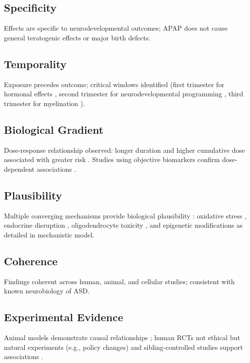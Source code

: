 \documentclass[12pt]{article}
\begin{document}
\subsection{Specificity}
Effects are specific to neurodevelopmental outcomes; APAP does not cause general teratogenic effects or major birth defects.

\subsection{Temporality}
Exposure precedes outcome; critical windows identified (first trimester for hormonal effects \citep{kristensen2016}, second trimester for neurodevelopmental programming \citep{avella2016}, third trimester for myelination \citep{liew2021}).

\subsection{Biological Gradient}
Dose-response relationship observed: longer duration and higher cumulative dose associated with greater risk \citep{liew2014,brandlistuen2013}. Studies using objective biomarkers confirm dose-dependent associations \citep{ji2020}.

\subsection{Plausibility}
Multiple converging mechanisms provide biological plausibility \citep{bauer2021}: oxidative stress \citep{parker2020}, endocrine disruption \citep{kristensen2016}, oligodendrocyte toxicity \citep{perez2012}, and epigenetic modifications \citep{zhu2021} as detailed in mechanistic model.

\subsection{Coherence}
Findings coherent across human, animal, and cellular studies; consistent with known neurobiology of ASD.

\subsection{Experimental Evidence}
Animal models demonstrate causal relationships \citep{viberg2014,philippot2022,blecharz2018}; human RCTs not ethical but natural experiments (e.g., policy changes) and sibling-controlled studies support associations \citep{brandlistuen2013,stergiakouli2016}.
\end{document}
